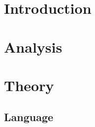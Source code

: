 


\frontmatter %
\newcommand{\ind}[1]{}

\ind{FormaliaForside}
\cleardoublepage %

\ind{FormaliaTitelblad}
\cleardoublepage
\ind{FormaliaProlog.tex}
\ind{FormaliaUnderskriftsside.tex}
\cleardoublepage



\setlength\parskip{0ex} %
\tableofcontents* %
\setlength{\parskip}{3mm} %



\label{marker}
\mainmatter

\pagestyle{custom}

\chapter{Introduction}
\ind{FormaliaIndledning}

\renewcommand{\ind}[1]{}
\chapter{Analysis}
	\ind{ourEnvironment}
	\ind{Hardware}
	\ind{problemstatement}

\renewcommand{\ind}[1]{}
\chapter{Theory}
	\ind{OverviewCompiler}

	\section{Language}
	\ind{sprogParadigmer}


